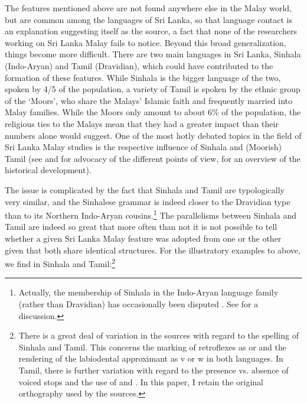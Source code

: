 \documentclass[a4paper,10pt]{article}
\newcommand{\D}{\dz}
\newcommand{\R}{\textipa{\textsubbar{r}}}
\newcommand{\NN}{\textipa{\textsubbar{n}}}
\begin{document}
The features mentioned above are not found anywhere else in the Malay world, but are common among the languages of Sri Lanka, so that language contact is an explanation suggesting itself as the source, a fact that none of the researchers working on Sri Lanka Malay fails to notice. Beyond this broad generalization, things become more difficult. There are two main languages in Sri Lanka, Sinhala (Indo-Aryan) and Tamil (Dravidian), which could have contributed to the formation of these features. While Sinhala is the bigger language of the two, spoken by 4/5 of the population, a variety of Tamil is spoken by the ethnic group of the `Moors', who share the Malays' Islamic faith and frequently married into Malay families. While the Moors only amount to about 6\% of the population, the religious ties to the Malays mean that they had a greater impact than their numbers alone would suggest. One of the most hotly debated topics in the field of Sri Lanka Malay studies is the respective influence of Sinhala and (Moorish) Tamil (see \citet{SmithEtAl2006cll} and \citet{Ansaldo2008genesis} for advocacy of the different points of view, \citet{Nordhoff2009phd} for an overview of the historical development).

The issue is complicated by the fact that Sinhala and Tamil are typologically very similar, and the Sinhalese grammar is indeed closer to the Dravidian type than to its Northern Indo-Aryan cousins.\footnote{Actually, 
 the membership of Sinhala in the Indo-Aryan language family (rather than Dravidian) has occasionally been disputed \citep{Lassen1847,Tennent1859}. See \citet{Geiger1938} for a discussion.
}
The parallelisms between Sinhala and Tamil are indeed so great that more often than not it is not possible to tell whether a given Sri Lanka Malay feature was adopted from one or the other given that both share identical structures. For the illustratory examples  to  above, we find in Sinhala and Tamil:\footnote{There is a great deal of variation in the sources with regard to the spelling of Sinhala and Tamil. This concerns the marking of retroflexes as \dott{} or \tz{} and the rendering of the labiodental approximant as v or w in both languages. In Tamil, there is further variation with regard to  the presence vs. absence of voiced stops and the use of \NN{} and \R{}. In this paper, I retain the original orthography used by the sources.} 

\xbox{\textwidth}{
 \ea\label{ex:adstr:retro}
  \ea 
   \gll kudu : ku\D{}u   \textsc{Sinhala} \\
        bent { } powder    \\ 
  \ex
   \gll kade : ka\D{}e  \textsc{Tamil} \\
         story { } shop     \\  
  \z 
\z
}
\end{document}
